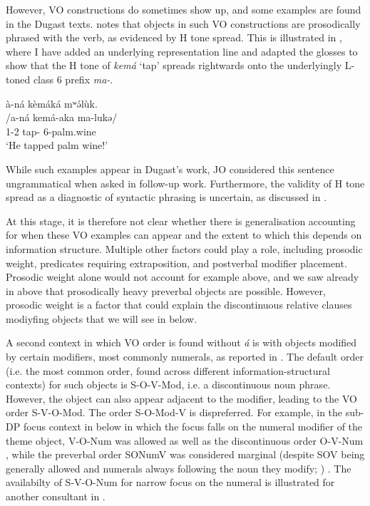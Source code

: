 \documentclass[output=paper,colorlinks,citecolor=brown
]{langscibook}
\begin{document}
 \z


However, VO constructions do sometimes show up, and some examples are found in the Dugast texts. \citet{Mous2003} notes that objects in such VO constructions are prosodically phrased with the verb, as evidenced by H tone spread. This is illustrated in , where I have added an underlying representation line and adapted the glosses to show that the H tone of \textit{kemá} `tap' spreads rightwards onto the underlyingly L-toned class 6 prefix \textit{ma-}.

\ea
\label{palmwinetap}
\glll
{\db}à-ná kèmáká mʷə́lùk. \\
/a-ná kemá-aka ma-lukə/ \\
{\db}1\SM{}-\PST{}2{} tap-\DUR{} 6-palm.wine \\
\glt
`He tapped palm wine!' 

\z

While such examples appear in Dugast's work, JO considered this sentence ungrammatical when asked in follow-up work. Furthermore, the validity of H tone spread as a diagnostic of syntactic phrasing is uncertain, as discussed in \citet[304--305]{KerrFut}.

At this stage, it is therefore not clear whether there is generalisation accounting for when these VO examples can appear and the extent to which this depends on information structure. Multiple other factors could play a role, including prosodic weight, predicates requiring extraposition, and postverbal modifier placement. Prosodic weight alone would not account for example  above, and we saw already in  above that prosodically heavy preverbal objects are possible. However, prosodic weight is a factor that could explain the discontinuous relative clauses modiyfing objects that we will see in  below.

A second context in which VO order is found without \textit{á} is with objects modified by certain modifiers, most commonly numerals, as reported in \citep[Chapter 7]{KerrFut}. The default order (i.e. the most common order, found across different information-structural contexts) for such objects is S-O-V-Mod, i.e. a discontinuous noun phrase. However, the object can also appear adjacent to the modifier, leading to the VO order S-V-O-Mod. The order S-O-Mod-V is dispreferred.  For example, in the sub-DP focus context in  below in which the focus falls on the numeral modifier of the theme object, V-O-Num was allowed  as well as the discontinuous order O-V-Num , while the preverbal order SONumV was considered marginal (despite SOV being generally allowed and numerals always following the noun they modify; \citealp{Dugast1971, Mous2003, Kerr2020, KerrFut}) . The availabilty of S-V-O-Num for narrow focus on the numeral is illustrated for another consultant in .
\end{document}
